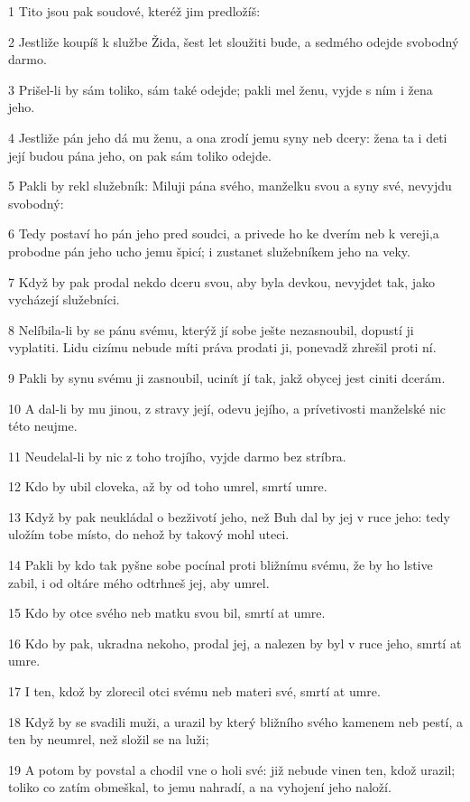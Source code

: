 \par 1 Tito jsou pak soudové, kteréž jim predložíš:
\par 2 Jestliže koupíš k službe Žida, šest let sloužiti bude, a sedmého odejde svobodný darmo.
\par 3 Prišel-li by sám toliko, sám také odejde; pakli mel ženu, vyjde s ním i žena jeho.
\par 4 Jestliže pán jeho dá mu ženu, a ona zrodí jemu syny neb dcery: žena ta i deti její budou pána jeho, on pak sám toliko odejde.
\par 5 Pakli by rekl služebník: Miluji pána svého, manželku svou a syny své, nevyjdu svobodný:
\par 6 Tedy postaví ho pán jeho pred soudci, a privede ho ke dverím neb k vereji,a probodne pán jeho ucho jemu špicí; i zustanet služebníkem jeho na veky.
\par 7 Když by pak prodal nekdo dceru svou, aby byla devkou, nevyjdet tak, jako vycházejí služebníci.
\par 8 Nelíbila-li by se pánu svému, kterýž jí sobe ješte nezasnoubil, dopustí ji vyplatiti. Lidu cizímu nebude míti práva prodati ji, ponevadž zhrešil proti ní.
\par 9 Pakli by synu svému ji zasnoubil, ucinít jí tak, jakž obycej jest ciniti dcerám.
\par 10 A dal-li by mu jinou, z stravy její, odevu jejího, a prívetivosti manželské nic této neujme.
\par 11 Neudelal-li by nic z toho trojího, vyjde darmo bez stríbra.
\par 12 Kdo by ubil cloveka, až by od toho umrel, smrtí umre.
\par 13 Když by pak neukládal o bezživotí jeho, než Buh dal by jej v ruce jeho: tedy uložím tobe místo, do nehož by takový mohl uteci.
\par 14 Pakli by kdo tak pyšne sobe pocínal proti bližnímu svému, že by ho lstive zabil, i od oltáre mého odtrhneš jej, aby umrel.
\par 15 Kdo by otce svého neb matku svou bil, smrtí at umre.
\par 16 Kdo by pak, ukradna nekoho, prodal jej, a nalezen by byl v ruce jeho, smrtí at umre.
\par 17 I ten, kdož by zlorecil otci svému neb materi své, smrtí at umre.
\par 18 Když by se svadili muži, a urazil by který bližního svého kamenem neb pestí, a ten by neumrel, než složil se na luži;
\par 19 A potom by povstal a chodil vne o holi své: již nebude vinen ten, kdož urazil; toliko co zatím obmeškal, to jemu nahradí, a na vyhojení jeho naloží.

